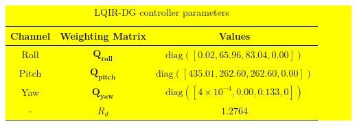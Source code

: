 \documentclass[3p]{elsarticle}
\begin{document}
\begin{table}[H]
    \centering
    \colorbox{yellow}{ %
    \begin{minipage}{\linewidth} %
        \caption{LQIR-DG controller parameters}
        \renewcommand{\arraystretch}{1.3}
        \centering
        \begin{tabular}{@{}ccc@{}}
        \toprule
        Channel & Weighting Matrix & Values \\
        \midrule
        Roll & $\mathbf{Q_{roll}}$ & $\text{diag}([0.02, 65.96, 83.04, 0.00])$ \\
        Pitch & $\mathbf{Q_{pitch}}$ & $\text{diag}([435.01, 262.60, 262.60, 0.00])$ \\
        Yaw & $\mathbf{Q_{yaw}}$ & $\text{diag}([4 \times 10^{-4}, 0.00, 0.133, 0])$ \\
        -&$R_d$ & $1.2764$ \\
        \bottomrule
        \end{tabular}
        \label{tab:control_weight_new}
    \end{minipage}
    }
\end{table}
\end{document}
